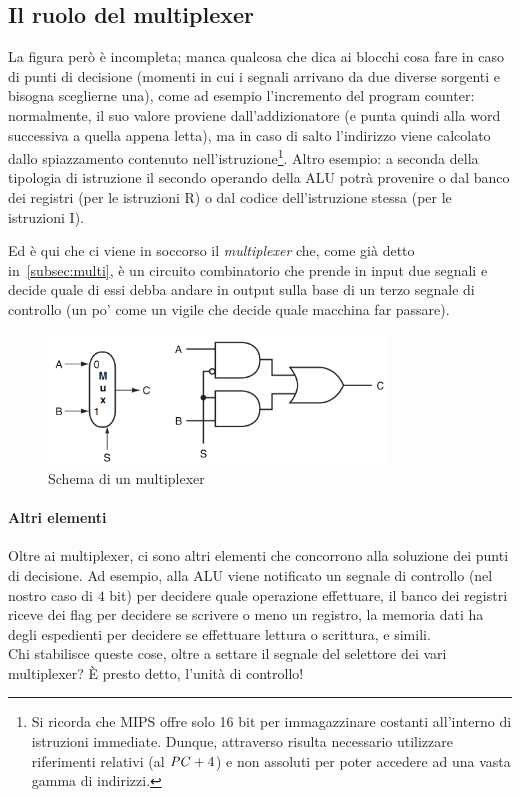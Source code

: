 \documentclass[class=book, crop=false, oneside]{standalone}
\begin{document}
\subsection{Il ruolo del multiplexer}
La  figura però è incompleta; manca qualcosa che dica ai blocchi cosa fare in caso di punti di decisione (momenti in cui i segnali arrivano da due diverse sorgenti e bisogna sceglierne una), come ad esempio l'incremento del program counter: normalmente, il suo valore proviene dall'addizionatore (e punta quindi alla word successiva a quella appena letta), ma in caso di salto l'indirizzo viene calcolato dallo spiazzamento contenuto nell'istruzione\footnote{Si ricorda che MIPS offre  solo 16 bit per immagazzinare costanti all'interno di istruzioni immediate. Dunque, attraverso  risulta necessario utilizzare riferimenti relativi (al \(\textrm{\emph{PC}}+4\)) e non assoluti per poter accedere ad una vasta gamma di indirizzi.}. Altro esempio: a seconda della tipologia di istruzione il secondo operando della ALU potrà provenire o dal banco dei registri (per le istruzioni R) o dal codice dell'istruzione stessa (per le istruzioni I).

Ed è qui che ci viene in soccorso il \emph{multiplexer} che, come già detto in~\ref{subsec:multi}, è un circuito combinatorio che prende in input due segnali e decide quale di essi debba andare in output sulla base di un terzo segnale di controllo (un po' come un vigile che decide quale macchina far passare).
\begin{figure}[H]
	\centering
	\includegraphics[width=0.8\textwidth,keepaspectratio]{muxx}
	\caption{Schema di un multiplexer}
\end{figure}
\paragraph{Altri elementi}
Oltre ai multiplexer, ci sono altri elementi che concorrono alla soluzione dei punti di decisione. Ad esempio, alla ALU viene notificato un segnale di controllo (nel nostro caso di \(4\) bit) per decidere quale operazione effettuare, il banco dei registri riceve dei flag per decidere se scrivere o meno un registro, la memoria dati ha degli espedienti per decidere se effettuare lettura o scrittura, e simili.\\
Chi stabilisce queste cose, oltre a settare il segnale del selettore dei vari multiplexer? È presto detto, l’unità di controllo!\\
\end{document}
